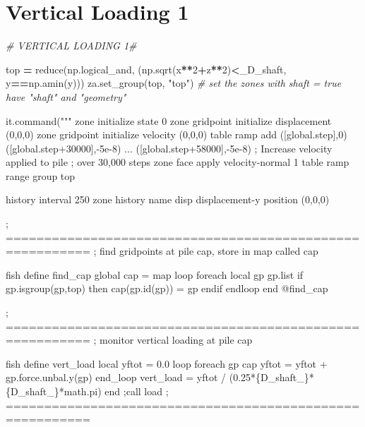 \documentclass[a4paper, nobind]{templates/ociamthesis}
\newenvironment{Shaded}{\begin{snugshade}}{\end{snugshade}}
\newcommand{\BuiltInTok}[1]{#1}
\newcommand{\CommentTok}[1]{\textcolor[rgb]{0.56,0.35,0.01}{\textit{#1}}}
\newcommand{\DecValTok}[1]{\textcolor[rgb]{0.00,0.00,0.81}{#1}}
\newcommand{\NormalTok}[1]{#1}
\newcommand{\OperatorTok}[1]{\textcolor[rgb]{0.81,0.36,0.00}{\textbf{#1}}}
\newcommand{\SpecialCharTok}[1]{\textcolor[rgb]{0.00,0.00,0.00}{#1}}
\newcommand{\StringTok}[1]{\textcolor[rgb]{0.31,0.60,0.02}{#1}}
\renewenvironment{Shaded}
{
  \vspace{10pt}%
  \begin{snugshade}%
}{%
  \end{snugshade}%
  \vspace{8pt}%
}
\begin{document}
\hypertarget{vertical-loading-1}{%
\section{Vertical Loading 1}\label{vertical-loading-1}}

\begin{Shaded}
\begin{Highlighting}[]
\CommentTok{\# VERTICAL LOADING 1\#}

\NormalTok{top }\OperatorTok{=} \BuiltInTok{reduce}\NormalTok{(np.logical\_and, (np.sqrt(x}\OperatorTok{**}\DecValTok{2}\OperatorTok{+}\NormalTok{z}\OperatorTok{**}\DecValTok{2}\NormalTok{)}\OperatorTok{\textless{}}\NormalTok{\_D\_shaft, y}\OperatorTok{==}\NormalTok{np.amin(y)))}
\NormalTok{za.set\_group(top, }\StringTok{"top"}\NormalTok{) }\CommentTok{\# set the zones with shaft = true have "shaft" and "geometry"}

\NormalTok{it.command(}\StringTok{"""}
\StringTok{zone initialize state 0}
\StringTok{zone gridpoint initialize displacement (0,0,0)}
\StringTok{zone gridpoint initialize velocity     (0,0,0)}
\StringTok{table \textquotesingle{}ramp\textquotesingle{} add ([global.step],0) ([global.step+30000],{-}5e{-}8) ...}
\StringTok{      ([global.step+58000],{-}5e{-}8) ; Increase velocity applied to pile}
\StringTok{                                  ; over 30,000 steps}
\StringTok{zone face apply velocity{-}normal 1 table \textquotesingle{}ramp\textquotesingle{} range group \textquotesingle{}top\textquotesingle{}}

\StringTok{history interval 250}
\StringTok{zone history name \textquotesingle{}disp\textquotesingle{} displacement{-}y position (0,0,0)}

\StringTok{; =========================================================}
\StringTok{;  find gridpoints at pile cap, store in map called cap}

\StringTok{fish define find\_cap}
\StringTok{    global cap = map}
\StringTok{    loop foreach local gp gp.list}
\StringTok{        if gp.isgroup(gp,\textquotesingle{}top\textquotesingle{}) then}
\StringTok{            cap(gp.id(gp)) = gp}
\StringTok{        endif}
\StringTok{    endloop}
\StringTok{end}
\StringTok{@find\_cap}

\StringTok{; =========================================================}
\StringTok{; monitor vertical loading at pile cap}

\StringTok{fish define vert\_load}
\StringTok{    local yftot = 0.0}
\StringTok{    loop foreach gp cap}
\StringTok{        yftot = yftot + gp.force.unbal.y(gp)}
\StringTok{    end\_loop}
\StringTok{    vert\_load = yftot / (0.25*}\SpecialCharTok{\{D\_shaft\_\}}\StringTok{*}\SpecialCharTok{\{D\_shaft\_\}}\StringTok{*math.pi)}
\StringTok{end}
\StringTok{;call \textquotesingle{}load\textquotesingle{}}
\StringTok{; =========================================================}


\end{Highlighting}
\end{Shaded}
\end{document}
